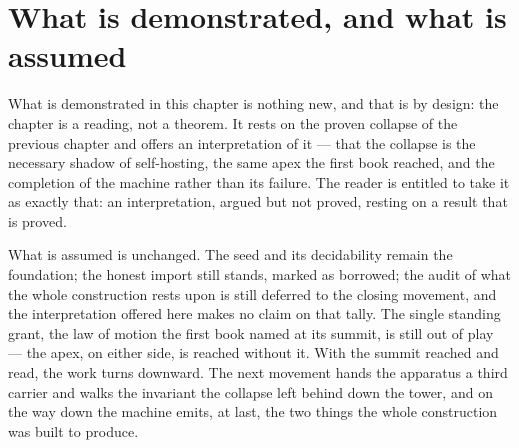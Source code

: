 \section{What is demonstrated, and what is assumed}
\label{se:demonstrated-assumed-II3}

What is demonstrated in this chapter is nothing new, and that is by design: the chapter is a reading, not a
theorem. It rests on the proven collapse of the previous chapter and offers an interpretation of it ---
that the collapse is the necessary shadow of self-hosting, the same apex the first book reached, and the
completion of the machine rather than its failure. The reader is entitled to take it as exactly that: an
interpretation, argued but not proved, resting on a result that is proved.

What is assumed is unchanged. The seed and its decidability remain the foundation; the honest import still
stands, marked as borrowed; the audit of what the whole construction rests upon is still deferred to the
closing movement, and the interpretation offered here makes no claim on that tally. The single standing
grant, the law of motion the first book named at its summit, is still out of play --- the apex, on either
side, is reached without it. With the summit reached and read, the work turns downward. The next movement
hands the apparatus a third carrier and walks the invariant the collapse left behind down the tower, and
on the way down the machine emits, at last, the two things the whole construction was built to produce.
